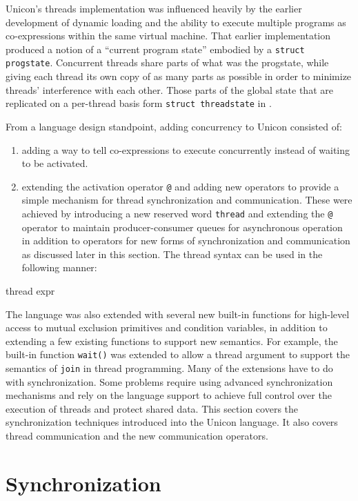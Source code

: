 Unicon's threads implementation was influenced heavily by the
earlier development of dynamic loading and the ability to execute
multiple programs as co-expressions within the same virtual machine.
That earlier implementation produced a notion of a ``current program
state'' embodied by a \texttt{struct progstate}. Concurrent threads
share parts of what was the progstate, while giving each thread its
own copy of as many parts as possible in order to minimize threads'
interference with each other.  Those parts of the global state that
are replicated on a per-thread basis form \texttt{struct threadstate}
in .

From a language design standpoint, adding concurrency to Unicon consisted of:
\begin{enumerate}
\item
  adding a way to tell co-expressions to execute concurrently instead of
  waiting to be activated.
\item
  extending the activation operator \texttt{@} and adding new
  operators to provide a simple mechanism for thread synchronization
  and communication. These were achieved by introducing a new reserved
  word \texttt{thread} and extending the \texttt{@} operator to
  maintain producer-consumer queues for asynchronous operation in
  addition to operators for new forms of synchronization and
  communication as discussed later in this section. The thread syntax
  can be used in the following manner:
\end{enumerate}

\begin{iconcode}
thread expr
\end{iconcode}

The language was also extended with several new built-in functions for
high-level access to mutual exclusion primitives and condition variables,
in addition to extending a few existing functions to support new semantics.
For example, the built-in function \texttt{wait()} was extended to allow a
thread argument to support the semantics of \texttt{join} in thread
programming. Many of the extensions have to do with synchronization. Some
problems require using advanced synchronization mechanisms and rely on the
language support to achieve full control over the execution of threads and
protect shared data. This section covers the synchronization techniques
introduced into the Unicon language. It also covers thread communication
and the new communication operators.

\section{Synchronization}

